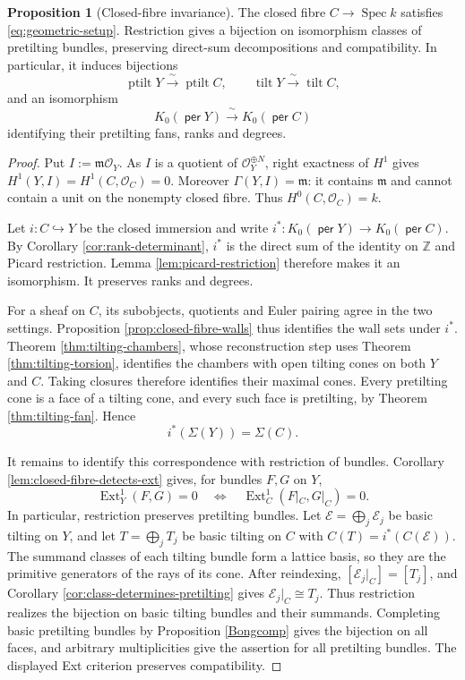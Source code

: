 \documentclass[a4paper,reqno]{amsart}
\def\E{\mathcal{E}}
\def\O{\mathcal{O}}
\def\m{\mathfrak{m}}
\DeclareMathOperator{\per}{\mathsf{per}}
\DeclareMathOperator{\Ext}{Ext}
\DeclareMathOperator{\Spec}{Spec}
\DeclareMathOperator{\tilt}{tilt}
\DeclareMathOperator{\ptilt}{ptilt}
\theoremstyle{definition}
\newtheorem{Prop}[Thm]{Proposition}
\begin{document}
\begin{Prop}[Closed-fibre invariance]\label{prop:closed-fibre-fan}
The closed fibre $C\to\Spec k$ satisfies \eqref{eq:geometric-setup}. Restriction gives a bijection on isomorphism classes of pretilting bundles, preserving direct-sum decompositions and compatibility. In particular, it induces bijections
\[
\ptilt Y\xrightarrow{\ \sim\ }\ptilt C,
\qquad
\tilt Y\xrightarrow{\ \sim\ }\tilt C,
\]
and an isomorphism
\[
K_0(\per Y)\xrightarrow{\ \sim\ }K_0(\per C)
\]
identifying their pretilting fans, ranks and degrees.
\end{Prop}
\begin{proof}
Put $I:=\m\O_Y$. As $I$ is a quotient of $\O_Y^{\oplus N}$, right exactness of $H^1$ gives $H^1(Y,I)=H^1(C,\O_C)=0$. Moreover $\Gamma(Y,I)=\m$: it contains $\m$ and cannot contain a unit on the nonempty closed fibre. Thus $H^0(C,\O_C)=k$.

Let $i\colon C\hookrightarrow Y$ be the closed immersion and write $i^*\colon K_0(\per Y)\to K_0(\per C)$. By Corollary \ref{cor:rank-determinant}, $i^*$ is the direct sum of the identity on $\mathbb Z$ and Picard restriction. Lemma \ref{lem:picard-restriction} therefore makes it an isomorphism. It preserves ranks and degrees.

For a sheaf on $C$, its subobjects, quotients and Euler pairing agree in the two settings. Proposition \ref{prop:closed-fibre-walls} thus identifies the wall sets under $i^*$. Theorem \ref{thm:tilting-chambers}, whose reconstruction step uses Theorem \ref{thm:tilting-torsion}, identifies the chambers with open tilting cones on both $Y$ and $C$. Taking closures therefore identifies their maximal cones. Every pretilting cone is a face of a tilting cone, and every such face is pretilting, by Theorem \ref{thm:tilting-fan}. Hence
\[
i^*(\Sigma(Y))=\Sigma(C).
\]

It remains to identify this correspondence with restriction of bundles. Corollary \ref{lem:closed-fibre-detects-ext} gives, for bundles $F,G$ on $Y$,
\[
\Ext_Y^1(F,G)=0
\quad\Longleftrightarrow\quad
\Ext_C^1(F|_C,G|_C)=0.
\]
In particular, restriction preserves pretilting bundles. Let $\E=\bigoplus_j\E_j$ be basic tilting on $Y$, and let $T=\bigoplus_jT_j$ be basic tilting on $C$ with $C(T)=i^*(C(\E))$. The summand classes of each tilting bundle form a lattice basis, so they are the primitive generators of the rays of its cone. After reindexing, $[\E_j|_C]=[T_j]$, and Corollary \ref{cor:class-determines-pretilting} gives $\E_j|_C\cong T_j$. Thus restriction realizes the bijection on basic tilting bundles and their summands. Completing basic pretilting bundles by Proposition \ref{Bongcomp} gives the bijection on all faces, and arbitrary multiplicities give the assertion for all pretilting bundles. The displayed Ext criterion preserves compatibility.
\end{proof}
\end{document}
